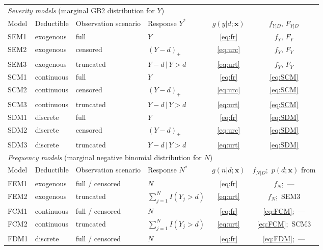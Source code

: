 \documentclass[11pt]{article}
\begin{document}
\begin{table}[!ht]
\color{blue}
\centering
\small
\renewcommand{\arraystretch}{1.15}
\begin{tabular}{llllcc}
\toprule
\multicolumn{6}{l}{\textit{Severity models} (marginal GB2 distribution for $Y$)}\\
Model & Deductible & Observation scenario & Response $Y^*$ & $g(y|d;\bm{x})$ & $f_{Y|D},\,F_{Y|D}$ \\
\midrule
SEM1 & exogenous  & full      & $Y$                 & \eqref{eq:fr}  & $f_{Y},\,F_{Y}$ \\
SEM2 & exogenous  & censored  & $(Y-d)_+$           & \eqref{eq:urc} & $f_{Y},\,F_{Y}$ \\
SEM3 & exogenous  & truncated & $Y-d\,|\,Y>d$     & \eqref{eq:urt} & $f_{Y},\,F_{Y}$ \\
SCM1 & continuous & full      & $Y$                 & \eqref{eq:fr}  & \eqref{eq:SCM} \\
SCM2 & continuous & censored  & $(Y-d)_+$           & \eqref{eq:urc} & \eqref{eq:SCM} \\
SCM3 & continuous & truncated & $Y-d\,|\,Y>d$     & \eqref{eq:urt} & \eqref{eq:SCM} \\
SDM1 & discrete   & full      & $Y$                 & \eqref{eq:fr}  & \eqref{eq:SDM} \\
SDM2 & discrete   & censored  & $(Y-d)_+$           & \eqref{eq:urc} & \eqref{eq:SDM} \\
SDM3 & discrete   & truncated & $Y-d\,|\,Y>d$     & \eqref{eq:urt} & \eqref{eq:SDM} \\
\midrule
\multicolumn{6}{l}{\textit{Frequency models} (marginal negative binomial distribution for $N$)}\\
Model & Deductible & Observation scenario & Response $N^*$ & $g(n|d;\bm{x})$ & $f_{N|D}$;\ $p(d;\bm{x})$ from \\
\midrule
FEM1 & exogenous  & full / censored & $N$                            & \eqref{eq:fr}  & $f_{N}$;\ --- \\
FEM2 & exogenous  & truncated       & $\sum_{j=1}^{N} I(Y_j>d)$    & \eqref{eq:urt} & $f_{N}$;\ SEM3 \\
FCM1 & continuous & full / censored & $N$                            & \eqref{eq:fr}  & \eqref{eq:FCM};\ --- \\
FCM2 & continuous & truncated       & $\sum_{j=1}^{N} I(Y_j>d)$    & \eqref{eq:urt} & \eqref{eq:FCM};\ SCM3 \\
FDM1 & discrete   & full / censored & $N$                            & \eqref{eq:fr}  & \eqref{eq:FDM};\ --- \\

\end{tabular}
\end{table}
\end{document}
